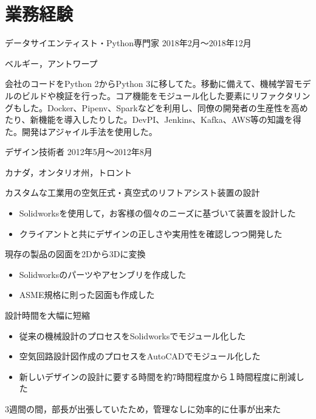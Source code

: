 \documentclass[10pt, a4paper]{article}
\begin{document}
\section{業務経験}
\begin{outerlist}
\item[\href{https://sentiance.com}{\parbox[t]{3cm}{\raggedleft Sentiance有限会社}}]{データサイエンティスト・Python専門家} \hfill {2018年2月〜2018年12月}

\hfill ベルギー，アントワープ
    \begin{innerlist}
    \item {会社のコードをPython 2からPython 3に移してた。移動に備えて、機械学習モデルのビルドや検証を行った。コア機能をモジュール化した要素にリファクタリングもした。Docker、Pipenv、Sparkなどを利用し、同僚の開発者の生産性を高めたり、新機能を導入したりした。DevPI、Jenkins、Kafka、AWS等の知識を得た。開発はアジャイル手法を使用した。}
    \end{innerlist}

\item[\href{http://starquip.com/}{\parbox[t]{3cm}{\raggedleft Starquip Integrated Systems有限会社}}]{デザイン技術者} \hfill {2012年5月〜2012年8月}

\vspace{-\baselineskip}    
\hfill カナダ，オンタリオ州，トロント

  \begin{innerlist}
  \item カスタムな工業用の空気圧式・真空式のリフトアシスト装置の設計
  \begin{itemize}
    \item Solidworksを使用して，お客様の個々のニーズに基づいて装置を設計した
    \item クライアントと共にデザインの正しさや実用性を確認しつつ開発した
  \end{itemize}
  \item 現存の製品の図面を2Dから3Dに変換
  \begin{itemize}
    \item Solidworksのパーツやアセンブリを作成した
    \item ASME規格に則った図面も作成した
  \end{itemize}
  \item 設計時間を大幅に短縮
  \begin{itemize}
    \item 従来の機械設計のプロセスをSolidworksでモジュール化した
    \item 空気回路設計図作成のプロセスをAutoCADでモジュール化した
    \item 新しいデザインの設計に要する時間を約7時間程度から１時間程度に削減した
  \end{itemize}
  \item 3週間の間，部長が出張していたため，管理なしに効率的に仕事が出来た
  \end{innerlist}


\end{outerlist}
\end{document}
